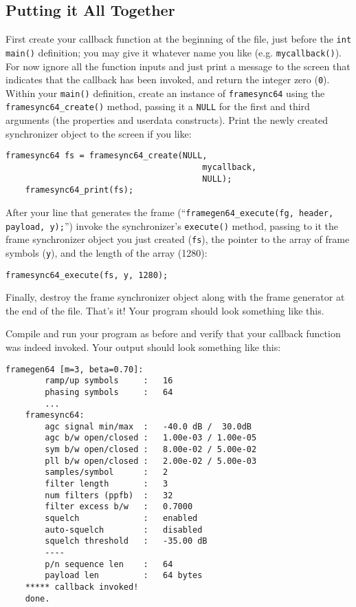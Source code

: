 %
%
\subsection{Putting it All Together}
\label{tutorial:framing:xxx}

First create your callback function at the beginning of the file, just
before the {\tt int main()} definition;
you may give it whatever name you like (e.g. {\tt mycallback()}).
For now ignore all the function inputs and just print a message to the
screen that indicates that the callback has been invoked,
and return the integer zero ({\tt 0}).
Within your {\tt main()} definition, create an instance of
{\tt framesync64} using the {\tt framesync64\_create()} method,
passing it a {\tt NULL} for the first and third arguments
(the properties and userdata constructs).
Print the newly created synchronizer object to the screen if you like:
%
\begin{Verbatim}[fontsize=\small]
    framesync64 fs = framesync64_create(NULL,
                                        mycallback,
                                        NULL);
    framesync64_print(fs);
\end{Verbatim}
%
After your line that generates the frame
(``{\tt framegen64\_execute(fg, header, payload, y);}'')
invoke the synchronizer's {\tt execute()} method,
passing to it the frame synchronizer object you just created ({\tt fs}),
the pointer to the array of frame symbols ({\tt y}),
and the length of the array (1280):
%
\begin{Verbatim}[fontsize=\small]
    framesync64_execute(fs, y, 1280);
\end{Verbatim}
%
Finally, destroy the frame synchronizer object along with the frame
generator at the end of the file.
That's it!
Your program should look something like this.
%

%
Compile and run your program as before and verify that your callback
function was indeed invoked.
Your output should look something like this:
%
\begin{Verbatim}[fontsize=\small]
    framegen64 [m=3, beta=0.70]:
        ramp/up symbols     :   16
        phasing symbols     :   64
        ...
    framesync64:
        agc signal min/max  :   -40.0 dB /  30.0dB
        agc b/w open/closed :   1.00e-03 / 1.00e-05
        sym b/w open/closed :   8.00e-02 / 5.00e-02
        pll b/w open/closed :   2.00e-02 / 5.00e-03
        samples/symbol      :   2
        filter length       :   3
        num filters (ppfb)  :   32
        filter excess b/w   :   0.7000
        squelch             :   enabled
        auto-squelch        :   disabled
        squelch threshold   :   -35.00 dB
        ----
        p/n sequence len    :   64
        payload len         :   64 bytes
    ***** callback invoked!
    done.
\end{Verbatim}
